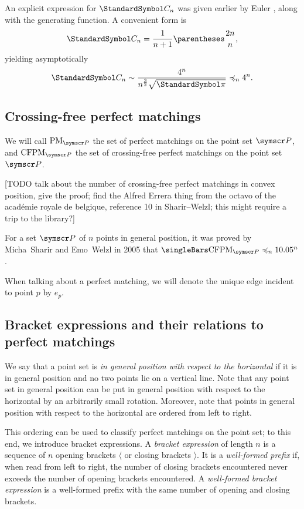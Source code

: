 \documentclass[10pt, a4paper, twoside]{basestyle}
\DeclareMathOperator{\PM}{PM}
\DeclareMathOperator{\CFPM}{CFPM}
\newcommand{\CatalanNumber}[1]{\StandardSymbol C_{#1}}
\newcommand{\pointset}{\symscr}
\begin{document}
An explicit expression for $\CatalanNumber n$ was given earlier by Euler \cite{Euler1751}, along
with the generating function.
A convenient form is\begin{equation}
\CatalanNumber n = \frac{1}{n+1} \binom {2n} {n}\text,
\end{equation}
yielding asymptotically
\begin{equation}
\CatalanNumber n \sim \frac{4^n}{n^{\frac{3}{2}}\sqrt{\Pi}} \preccurlyeq_n 4^n\text.
\end{equation}

\subsection{Crossing-free perfect matchings}
\label{PerfectMatchingsIntro}
We will call $\PM_{\pointset P}$ the set of perfect matchings on the point set $\pointset P$,
and $\CFPM_{\pointset P}$ the set
of crossing-free perfect matchings on the point set $\pointset P$.

[TODO talk about the number of crossing-free perfect matchings in convex position, give the proof;
find the Alfred Errera thing from the octavo of the académie royale de belgique, reference 10 in
Sharir--Welzl; this might require a trip to the library?]

For a set $\pointset P$ of $n$ points in general position, it was proved by Micha~Sharir and Emo~Welzl in 2005
\cite{SharirWelzl2006} that $\Cardinality{\CFPM_{\pointset P}} \preccurlyeq_n 10.05^n$.

When talking about a perfect matching, we will denote the unique edge incident to point $p$ by
$e_p$.

\subsection{Bracket expressions and their relations to perfect matchings}

We say that a point set is \emph{in general position with respect to the horizontal} if it
is in general position and no two points lie on a vertical line. Note that any point set in
general position can be put in general position with respect to the horizontal by an arbitrarily
small rotation. Moreover, note that points in general position with respect to the horizontal
are ordered from left to right.

This ordering can be used to classify perfect matchings on the point set; to this end,
we introduce bracket expressions.
A \emph{bracket expression} of length $n$ is a sequence of $n$ opening brackets $\langle$ or closing
brackets $\rangle$.
It is a \emph{well-formed prefix} if, when read from left to right, the number of closing brackets
encountered never exceeds the number of opening brackets encountered.
A \emph{well-formed bracket expression} is a well-formed prefix with the same number of opening and
closing brackets.
\end{document}
